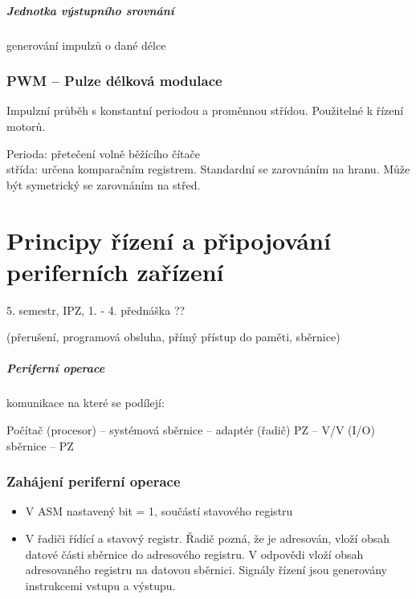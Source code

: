 \documentclass[a4paper, 11pt]{report}
\begin{document}
\paragraph{Jednotka výstupního srovnání}
generování impulzů o dané délce

\subsection{PWM -- Pulze délková modulace}
Impulzní průběh s konstantní periodou a proměnnou střídou. Použitelné k řízení motorů.

Perioda: přetečení volně běžícího čítače\\
střída: určena komparačním registrem. Standardní se zarovnáním na hranu. Může být symetrický se zarovnáním na střed.























\chapter{Principy řízení a připojování periferních zařízení} \label{cha:6}

5. semestr, IPZ, 1. - 4. přednáška ??

(přerušení, programová obsluha, přímý přístup do paměti, sběrnice)

\paragraph{Periferní operace} komunikace na které se podílejí:

Počítač (procesor) -- systémová sběrnice -- adaptér (řadič) PZ -- V/V (I/O) sběrnice -- PZ

\subsection{Zahájení periferní operace}

\begin{itemize}
	\item V ASM nastavený bit  = 1, součástí stavového registru
	\item V řadiči řídící a stavový registr. Řadič pozná, že je adresován, vloží obsah datové části sběrnice do adresového registru. V odpovědi vloží obsah adresovaného registru na datovou sběrnici. Signály řízení jsou generovány instrukcemi vstupu a výstupu.
\end{itemize}
\end{document}
